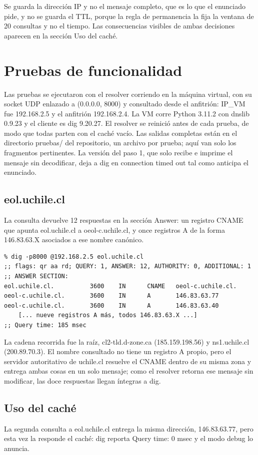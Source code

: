 \documentclass[
	spanish, %
	letterpaper, oneside
]{article}
\begin{document}
Se guarda la dirección IP y no el mensaje completo, que es lo que el enunciado pide, y no se guarda el TTL, porque la regla de permanencia la fija la ventana de 20 consultas y no el tiempo. Las consecuencias visibles de ambas decisiones aparecen en la sección Uso del caché.

\section{Pruebas de funcionalidad}
Las pruebas se ejecutaron con el resolver corriendo en la máquina virtual, con su socket UDP enlazado a (0.0.0.0, 8000) y consultado desde el anfitrión: IP\_VM fue 192.168.2.5 y el anfitrión 192.168.2.4. La VM corre Python 3.11.2 con dnslib 0.9.23 y el cliente es dig 9.20.27. El resolver se reinició antes de cada prueba, de modo que todas parten con el caché vacío. Las salidas completas están en el directorio pruebas/ del repositorio, un archivo por prueba; aquí van solo los fragmentos pertinentes. La versión del paso 1, que solo recibe e imprime el mensaje sin decodificar, deja a dig en connection timed out tal como anticipa el enunciado.

\subsection{eol.uchile.cl}
La consulta devuelve 12 respuestas en la sección Answer: un registro CNAME que apunta eol.uchile.cl a oeol-c.uchile.cl, y once registros A de la forma 146.83.63.X asociados a ese nombre canónico.

\begin{verbatim}
% dig -p8000 @192.168.2.5 eol.uchile.cl
;; flags: qr aa rd; QUERY: 1, ANSWER: 12, AUTHORITY: 0, ADDITIONAL: 1
;; ANSWER SECTION:
eol.uchile.cl.          3600    IN      CNAME   oeol-c.uchile.cl.
oeol-c.uchile.cl.       3600    IN      A       146.83.63.77
oeol-c.uchile.cl.       3600    IN      A       146.83.63.40
    [... nueve registros A más, todos 146.83.63.X ...]
;; Query time: 185 msec
\end{verbatim}

La cadena recorrida fue la raíz, cl2-tld.d-zone.ca (185.159.198.56) y ns1.uchile.cl (200.89.70.3). El nombre consultado no tiene un registro A propio, pero el servidor autoritativo de uchile.cl resuelve el CNAME dentro de su misma zona y entrega ambas cosas en un solo mensaje; como el resolver retorna ese mensaje sin modificar, las doce respuestas llegan íntegras a dig.

\subsection{Uso del caché}
La segunda consulta a eol.uchile.cl entrega la misma dirección, 146.83.63.77, pero esta vez la responde el caché: dig reporta Query time: 0 msec y el modo debug lo anuncia.
\end{document}
